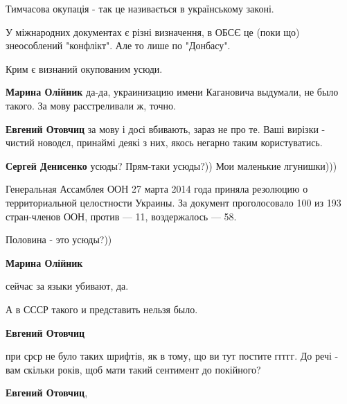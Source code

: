 \begin{itemize}
\begin{itemize}
Тимчасова окупація - так це називається в українському законі.

У міжнародних документах є різні визначення, в ОБСЄ це (поки що) знеособлений "конфлікт". Але то лише по "Донбасу".

Крим є визнаний окупованим усюди.



\textbf{Марина Олійник} да-да, украинизацию имени Кагановича выдумали, не было
такого. За мову расстреливали ж, точно.


\textbf{Евгений Отовчиц} за мову і досі вбивають, зараз не про те. Ваші вирізки
- чистий новодєл, принаймі деякі з них, якось негарно таким користуватись.


\textbf{Сергей Денисенко} усюды? Прям-таки усюды?)) Мои маленькие лгунишки)))

Генеральная Ассамблея ООН 27 марта 2014 года приняла резолюцию о
территориальной целостности Украины. За документ проголосовало 100 из 193
стран-членов ООН, против — 11, воздержалось — 58.

Половина - это усюды?))



\textbf{Марина Олійник} 

сейчас за языки убивают, да.

А в СССР такого и представить нельзя было.


\textbf{Евгений Отовчиц} 

при срср не було таких шрифтів, як в тому, що ви тут постите ггггг. До речі -
вам скільки років, щоб мати такий сентимент до покійного?



\textbf{Евгений Отовчиц}, 


\end{itemize}
\end{itemize}
